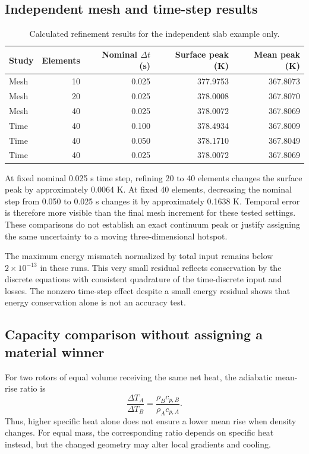 \documentclass[11pt,a4paper]{article}
\begin{document}
\clearpage
\subsection{Independent mesh and time-step results}
\begin{table}[h!]\centering\small
\begin{tabular}{@{}lrrrr@{}}\toprule
Study & Elements & Nominal $\Delta t$ (s) & Surface peak (K) & Mean peak (K)\\\midrule
Mesh &10&0.025&377.9753&367.8073\\
Mesh &20&0.025&378.0008&367.8070\\
Mesh &40&0.025&378.0072&367.8069\\\midrule
Time &40&0.100&378.4934&367.8009\\
Time &40&0.050&378.1710&367.8049\\
Time &40&0.025&378.0072&367.8069\\\bottomrule
\end{tabular}
\caption{Calculated refinement results for the independent slab example only.}
\end{table}
At fixed nominal 0.025 s time step, refining 20 to 40 elements changes the surface peak by approximately 0.0064 K. At fixed 40 elements, decreasing the nominal step from 0.050 to 0.025 s changes it by approximately 0.1638 K. Temporal error is therefore more visible than the final mesh increment for these tested settings. These comparisons do not establish an exact continuum peak or justify assigning the same uncertainty to a moving three-dimensional hotspot.

The maximum energy mismatch normalized by total input remains below $2\times10^{-13}$ in these runs. This very small residual reflects conservation by the discrete equations with consistent quadrature of the time-discrete input and losses. The nonzero time-step effect despite a small energy residual shows that energy conservation alone is not an accuracy test.

\subsection{Capacity comparison without assigning a material winner}
For two rotors of equal volume receiving the same net heat, the adiabatic mean-rise ratio is
\begin{equation}
\frac{\Delta T_A}{\Delta T_B}=\frac{\rho_Bc_{p,B}}{\rho_Ac_{p,A}}.
\end{equation}
Thus, higher specific heat alone does not ensure a lower mean rise when density changes. For equal mass, the corresponding ratio depends on specific heat instead, but the changed geometry may alter local gradients and cooling.
\end{document}
